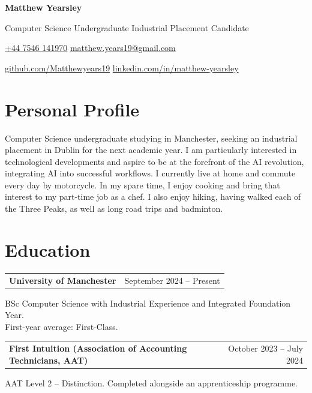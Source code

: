 \documentclass[11pt,a4paper]{article}
\makeatletter
\newcommand{\datedheading}[2]{%
 \noindent\begin{tabularx}{\linewidth}{@{}>{\raggedright\arraybackslash}X>{\raggedleft\arraybackslash}r@{}}
 \textbf{#1} & {\small\color{muted}#2}
 \end{tabularx}\par
}
\makeatother
\begin{document}
\begin{center}
 {\fontsize{22}{25}\selectfont\bfseries\color{accent} Matthew Yearsley}\par
 \vspace{3pt}
 {\small Computer Science Undergraduate \textbar{} Industrial Placement Candidate}\par
 \vspace{5pt}
 {\small
 \href{tel:+447546141970}{+44 7546 141970}
 \quad\textcolor{rulecolour}{\textbar}\quad
 \href{mailto:matthew.years19@gmail.com}{matthew.years19@gmail.com}
 }\par
 \vspace{2pt}
 {\small
 \href{https://github.com/Matthewyears19}{github.com/Matthewyears19}
 \quad\textcolor{rulecolour}{\textbar}\quad
 \href{https://www.linkedin.com/in/matthew-yearsley}{linkedin.com/in/matthew-yearsley}
 }\par
\end{center}
\vspace{-7pt}

\section*{Personal Profile}
Computer Science undergraduate studying in Manchester, seeking an industrial placement in Dublin for the next academic year. I am particularly interested in technological developments and aspire to be at the forefront of the AI revolution, integrating AI into successful workflows. I currently live at home and commute every day by motorcycle. In my spare time, I enjoy cooking and bring that interest to my part-time job as a chef. I also enjoy hiking, having walked each of the Three Peaks, as well as long road trips and badminton.

\section*{Education}
\datedheading{University of Manchester}{September 2024 -- Present}
BSc Computer Science with Industrial Experience and Integrated Foundation Year. \\
First-year average: First-Class.
\vspace{5pt}

\datedheading{First Intuition \textnormal{(Association of Accounting Technicians, AAT)}}{October 2023 -- July 2024}
AAT Level 2 -- Distinction. Completed alongside an apprenticeship programme.
\vspace{5pt}
\end{document}

